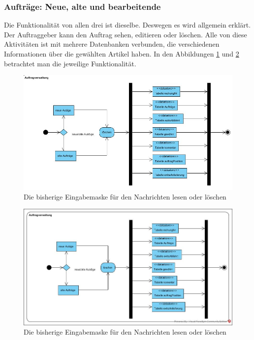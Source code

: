 \subsubsection{Aufträge: Neue, alte und bearbeitende}

Die Funktionalität von allen drei ist dieselbe. Deswegen es wird allgemein erklärt. Der Auftraggeber kann den Auftrag sehen, editieren oder löschen. Alle von diese Aktivitäten ist mit mehrere Datenbanken verbunden, die verschiedenen Informationen über die gewählten Artikel haben. In den Abbildungen \ref{fig:Autrag_Loeschen} und \ref{fig:auftragEinsehen} betrachtet man die jeweilige Funktionalität.


\begin{figure}[h]
	\centering
	\includegraphics[width=1\linewidth]{Graphics/Autrag_Loeschen.JPG}
	\caption[AutragLoeschen]{Die bisherige Eingabemaske für den Nachrichten lesen oder löschen}
	\label{fig:Autrag_Loeschen}
\end{figure}
 
\begin{figure}[h] 
	\centering
	\includegraphics[width=1\linewidth]{Graphics/Auftragverwaltung.jpg}
	\caption[auftragEinsehen]{Die bisherige Eingabemaske für den Nachrichten lesen oder löschen}
	\label{fig:auftragEinsehen}
\end{figure}

